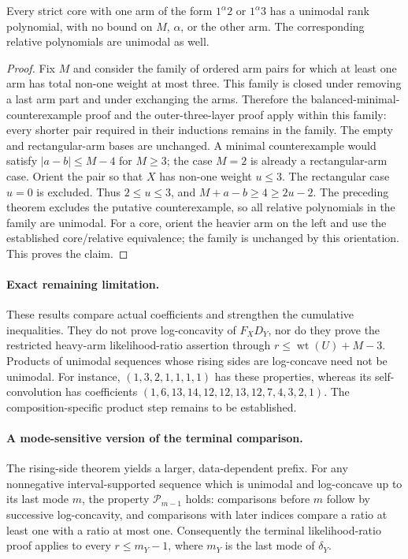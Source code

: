 \begin{corollary}
Every strict core with one arm of the form $1^\alpha 2$ or
$1^\alpha 3$ has a unimodal rank polynomial, with no bound on
$M$, $\alpha$, or the other arm. The corresponding relative
polynomials are unimodal as well.
\end{corollary}
\begin{proof}
Fix $M$ and consider the family of ordered arm pairs for which at
least one arm has total non-one weight at most three. This family
is closed under removing a last arm part and under exchanging
the arms. Therefore the balanced-minimal-counterexample proof
and the outer-three-layer proof apply within this family: every
shorter pair required in their inductions remains in the family.
The empty and rectangular-arm bases are unchanged. A minimal
counterexample would satisfy $|a-b|\le M-4$ for $M\ge3$;
the case $M=2$ is already a rectangular-arm case. Orient the pair
so that $X$ has non-one weight $u\le3$. The rectangular case
$u=0$ is excluded. Thus $2\le u\le3$, and
$M+a-b\ge4\ge2u-2$. The preceding theorem excludes the
putative counterexample, so all relative polynomials in the
family are unimodal. For a core, orient the heavier arm on the
left and use the established core/relative equivalence; the
family is unchanged by this orientation. This proves the claim.
\end{proof}

\paragraph{Exact remaining limitation.}
These results compare actual coefficients and strengthen the cumulative
inequalities. They do not prove log-concavity of $F_XD_Y$, nor do they
prove the restricted heavy-arm likelihood-ratio assertion through
$r\le\operatorname{wt}(U)+M-3$. Products of unimodal sequences whose
rising sides are log-concave need not be unimodal. For instance,
$(1,3,2,1,1,1,1)$ has these properties, whereas its self-convolution has
coefficients $(1,6,13,14,12,12,13,12,7,4,3,2,1)$. The composition-specific
product step remains to be established.

\paragraph{A mode-sensitive version of the terminal comparison.}
The rising-side theorem yields a larger, data-dependent prefix.
For any nonnegative interval-supported sequence which is unimodal
and log-concave up to its last mode $m$, the property
$\mathcal P_{m-1}$ holds: comparisons before $m$ follow by
successive log-concavity, and comparisons with later indices compare
a ratio at least one with a ratio at most one. Consequently the
terminal likelihood-ratio proof applies to every $r\le m_Y-1$,
where $m_Y$ is the last mode of $\delta_Y$.

